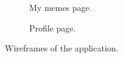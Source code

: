 \begin{figure}
    \begin{subfigure}{0.45\textwidth}
        \centering
        \caption{My memes page.}
        \label{fig:wireframes-my-memes}
    \end{subfigure}
    \hspace{1cm}
    \begin{subfigure}{0.45\textwidth}
        \centering
        \caption{Profile page.}
        \label{fig:wireframes-profile}
    \end{subfigure}
    \caption{Wireframes of the application.}
    \label{fig:wireframes}
\end{figure}

